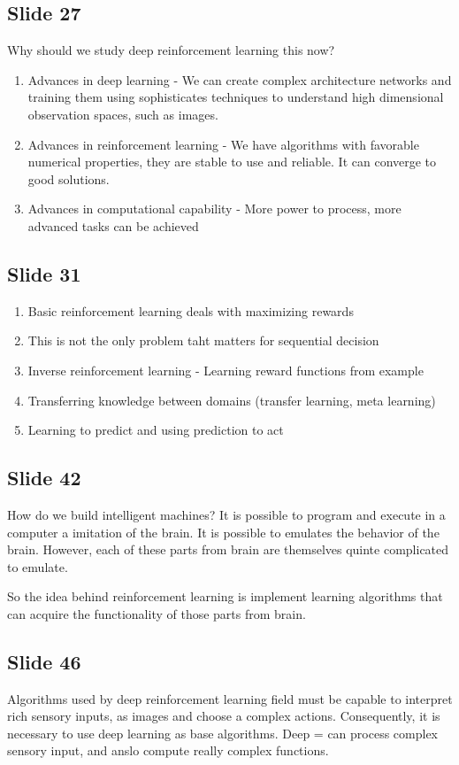 \documentclass{article}
\begin{document}
\subsection*{Slide 27}
\par Why should we study deep reinforcement learning this now?
\begin{enumerate}
    \item  Advances in deep learning - We can create complex architecture networks and training them using
        sophisticates techniques to understand  high dimensional observation spaces, such as images.
    \item  Advances in reinforcement learning - We have algorithms with favorable numerical properties, they are
        stable to use and reliable. It can converge to good solutions.
    \item Advances in computational capability - More power to process, more advanced tasks can be achieved
\end{enumerate}

\subsection*{Slide 31}%
\label{sub:Slide 31}

\par 
\begin{enumerate}
    \item Basic reinforcement learning deals with maximizing rewards
    \item This is not the only problem taht matters for sequential decision
    \item Inverse reinforcement learning - Learning reward functions from example
    \item Transferring knowledge between domains (transfer learning, meta learning)
    \item Learning to predict and using prediction to act
\end{enumerate}

\subsection*{Slide 42}%
\label{sub:Slide 42}
\par How do we build intelligent machines? It is possible to program and execute in a computer a imitation of the
brain. It is possible to emulates the behavior of the brain. However, each of these parts from brain are themselves
quinte complicated to emulate. 

\par So the idea behind reinforcement learning is implement learning algorithms that can acquire the functionality of
those parts from brain. 

\subsection*{Slide 46}%
\label{sub:Slide 46}
\par Algorithms used by deep reinforcement learning field must be capable to interpret rich sensory inputs, as images
and choose a complex actions. Consequently, it is necessary to use deep learning as base algorithms. Deep = can
process complex sensory input, and anslo compute really complex functions. 
\end{document}
